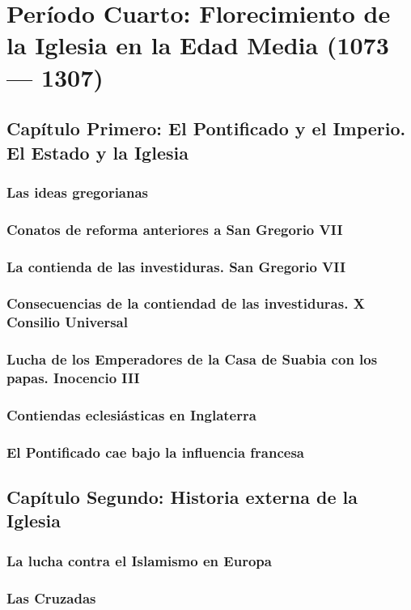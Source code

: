 \raggedbottom{} \documentclass[12pt, a4paper]{book}
\begin{document}
\part{Período Cuarto: Florecimiento de la Iglesia en la Edad Media (1073 --- 1307)}
\chapter{Capítulo Primero: El Pontificado y el Imperio. El Estado y la Iglesia}
\section{Las ideas gregorianas}
\section{Conatos de reforma anteriores a San Gregorio VII}
\section{La contienda de las investiduras. San Gregorio VII}
\section{Consecuencias de la contiendad de las investiduras. X Consilio Universal}
\section{Lucha de los Emperadores de la Casa de Suabia con los papas. Inocencio III}
\section{Contiendas eclesiásticas en Inglaterra}
\section{El Pontificado cae bajo la influencia francesa}
\chapter{Capítulo Segundo: Historia externa de  la Iglesia}
\section{La lucha contra el Islamismo en Europa}
\section{Las Cruzadas}
\end{document}
